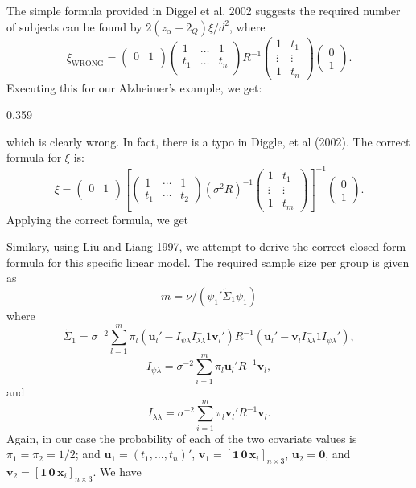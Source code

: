 \documentclass[12pt]{article}
\newcommand{\x}{\mathbf{x}}
\newcommand{\uu}{\mathbf{u}}
\newcommand{\vv}{\mathbf{v}}
\newcommand{\Ipl}{I_{\psi\lambda}}
\newcommand{\Ill}{I_{\lambda\lambda}}
\begin{document}
The simple formula provided in Diggel et al. 2002 suggests the required number of subjects can be found by $2(z_\alpha+2_Q)\xi/d^2$, where
\[
\xi_\textrm{WRONG}=
  \left(\begin{array}{cc}
    0 & 1\\ 
    \end{array}\right)
\left(\begin{array}{ccc}
1 & \ldots & 1 \\
t_1 & \ldots & t_n \\
\end{array}\right)R^{-1}
\left(\begin{array}{ccc}
1 & t_1 \\
\vdots & \vdots\\
1 & t_n
\end{array}\right)
  \left(\begin{array}{c}
    0 \\ 1
    \end{array}\right).
\]
Executing this for our Alzheimer's example, we get:
\begin{Schunk}
\begin{Soutput}
[1] 0.359
\end{Soutput}
\end{Schunk}
which is clearly wrong. In fact, there is a typo in Diggle, et al (2002). The correct formula for $\xi$ is:
\begin{equation}\label{eq:diggle3}
\xi = 
  \left(\begin{array}{cc}
    0 & 1\\ 
    \end{array}\right)
  \left[
  \left(\begin{array}{ccc}
    1 & \cdots & 1 \\
    t_1 & \cdots & t_2\end{array}\right)
  (\sigma^2R)^{-1}
  \left(\begin{array}{cc}
    1 & t_1 \\
    \vdots & \vdots \\
    1 & t_m\end{array}\right)\right]^{-1}
  \left(\begin{array}{c}
    0 \\ 1
    \end{array}\right).
\end{equation}
Applying the correct formula, we get

Similary, using Liu and Liang 1997, we attempt to derive the correct closed form formula for this specific linear model. The required sample size per group is given as
\[
m = \nu/(\psi_1'\tilde\Sigma_1\psi_1)
\]
where
\[
\tilde\Sigma_1 =\sigma^{-2}\sum_{l=1}^m\pi_l
(\uu_l'-\Ipl\Ill^-1\vv_l')R^{-1}
(\uu_l'-\vv_l\Ill^-1\Ipl'),
\]
\[
\Ipl=\sigma^{-2}\sum_{i=1}^m\pi_l
\uu_l'R^{-1}\vv_l,
\]
and
\[
\Ill=\sigma^{-2}\sum_{i=1}^m\pi_l
\vv_l'R^{-1}\vv_l.
\]
Again, in our case the probability of each of the two covariate values is $\pi_1=\pi_2=1/2$; and 
$\uu_1 = (t_1, \ldots, t_n)'$, $\vv_1 = [\mathbf{1}\, \mathbf{0}\, \x_i]_{n\times3}$, $\uu_2 = \mathbf{0}$, and $\vv_2 = [\mathbf{1}\, \mathbf{0}\, \x_i]_{n\times3}$. We have
\end{document}
